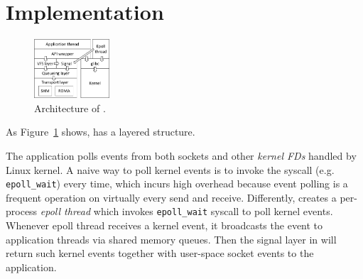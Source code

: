 \section{Implementation}
\label{sec:implementation}

\begin{figure}[t!]
	\centering
	\includegraphics[width=0.25\textwidth]{images/libsd_architecture}
	\vspace{-5pt}
	\caption{Architecture of \libipc{}.}
	\label{fig:libsd-architecture}
\end{figure}



As Figure~\ref{fig:libsd-architecture} shows, \libipc{} has a layered structure.








The application polls events from both sockets and other \textit{kernel FDs} handled by Linux kernel.
A naive way to poll kernel events is to invoke the syscall (e.g. \texttt{epoll\_wait}) every time, which incurs high overhead because event polling is a frequent operation on virtually every send and receive.
Differently, \libipc{} creates a per-process \textit{epoll thread} which invokes \texttt{epoll\_wait} syscall to poll kernel events. Whenever epoll thread receives a kernel event, it broadcasts the event to application threads via shared memory queues. Then the signal layer in \libipc{} will return such kernel events together with user-space socket events to the application.

